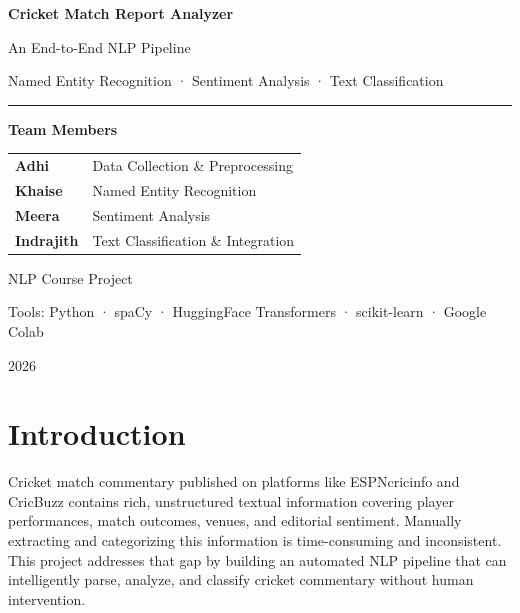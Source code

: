 \documentclass[12pt,a4paper]{article}
\begin{document}
\begin{titlepage}
  \centering
  \vspace*{2cm}
  {\Huge\bfseries\color{navyblue} Cricket Match Report Analyzer \par}
  \vspace{0.5cm}
  {\large\color{forestgreen} An End-to-End NLP Pipeline \par}
  \vspace{0.3cm}
  {\large\color{slategray} Named Entity Recognition · Sentiment Analysis · Text Classification \par}
  \vspace{2cm}
  \color{accent}\rule{0.6\linewidth}{1.5pt}
  \vspace{1cm}

  {\large\bfseries Team Members \par}
  \vspace{0.5cm}
  \begin{tabular}{ll}
    \textbf{Adhi}      & Data Collection \& Preprocessing \\[4pt]
    \textbf{Khaise}    & Named Entity Recognition \\[4pt]
    \textbf{Meera}     & Sentiment Analysis \\[4pt]
    \textbf{Indrajith} & Text Classification \& Integration \\
  \end{tabular}

  \vspace{2cm}
  {\large\color{slategray} NLP Course Project \par}
  \vspace{0.3cm}
  {\normalsize\color{slategray} Tools: Python · spaCy · HuggingFace Transformers · scikit-learn · Google Colab \par}
  \vfill
  {\normalsize 2026}
\end{titlepage}

\tableofcontents
\newpage

\section{Introduction}

Cricket match commentary published on platforms like ESPNcricinfo and CricBuzz contains rich, unstructured textual information covering player performances, match outcomes, venues, and editorial sentiment. Manually extracting and categorizing this information is time-consuming and inconsistent. This project addresses that gap by building an automated NLP pipeline that can intelligently parse, analyze, and classify cricket commentary without human intervention.
\end{document}
